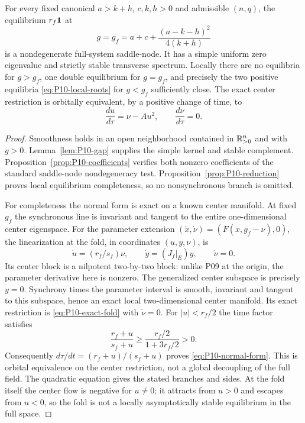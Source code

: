 \begin{theorem}
\label{thm:P10-saddle-node}
For every fixed canonical $a>k+h$, $c,k,h>0$ and admissible $(n,q)$,
the equilibrium $r_f\mathbf{1}$ at
\[
 \boxed{g=g_f=a+c+\frac{(a-k-h)^2}{4(k+h)}}
\]
is a nondegenerate full-system saddle-node. It has a simple uniform
zero eigenvalue and strictly stable transverse spectrum. Locally there
are no equilibria for $g>g_f$, one double equilibrium for $g=g_f$,
and precisely the two positive equilibria \eqref{eq:P10-local-roots}
for $g<g_f$ sufficiently close. The exact center restriction is
orbitally equivalent, by a positive change of time, to
\begin{equation}
 \boxed{\frac{du}{d\tau}=\nu-Au^2,\qquad \frac{d\nu}{d\tau}=0.}
 \label{eq:P10-normal-form}
\end{equation}
\end{theorem}
\begin{proof}
Smoothness holds in an open neighborhood contained in $\mathbb{R}_{>0}^{n}$
and with $g>0$. Lemma~\ref{lem:P10-gap} supplies the simple kernel
and stable complement. Proposition~\ref{prop:P10-coefficients}
verifies both nonzero coefficients of the standard saddle-node
nondegeneracy test. Proposition~\ref{prop:P10-reduction} proves
local equilibrium completeness, so no nonsynchronous branch is omitted.

For completeness the normal form is exact on a known center manifold.
At fixed $g_f$ the synchronous line is invariant and tangent to the
entire one-dimensional center eigenspace. For the parameter extension
$(\dot x,\dot\nu)=(F(x,g_f-\nu),0)$, the linearization at the fold,
in coordinates $(u,y,\nu)$, is
\begin{equation}
 \dot u=(r_f/s_f)\nu,\qquad \dot y=(J_f|_E)y,\qquad \dot\nu=0.
 \label{eq:P10-extended-linear}
\end{equation}
Its center block is a nilpotent two-by-two block: unlike P09 at the
origin, the parameter derivative here is nonzero. The generalized
center subspace is precisely $y=0$. Synchrony times the parameter
interval is smooth, invariant and tangent to this subspace, hence an
exact local two-dimensional center manifold. Its exact restriction
is \eqref{eq:P10-exact-fold} with $\dot\nu=0$.
For $|u|<r_f/2$ the time factor satisfies
\[
 \frac{r_f+u}{s_f+u}\ge\frac{r_f/2}{1+3r_f/2}>0.
\]
Consequently $d\tau/dt=(r_f+u)/(s_f+u)$ proves
\eqref{eq:P10-normal-form}. This is orbital equivalence on the
center restriction, not a global decoupling of the full field.
The quadratic equation gives the stated branches and sides.
At the fold itself the center flow is negative for $u\ne0$;
it attracts from $u>0$ and escapes from $u<0$, so the fold is
not a locally asymptotically stable equilibrium in the full space.
\end{proof}

